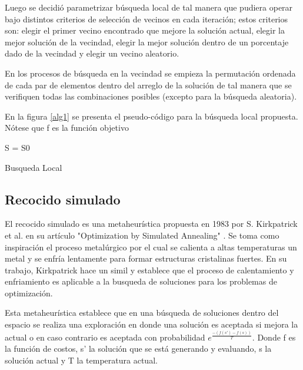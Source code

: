 \documentclass{ci5652}
\begin{document}
Luego se decidió parametrizar búsqueda local de tal manera que pudiera operar bajo distintos criterios de selección de vecinos en cada iteración; estos criterios son: elegir el primer vecino encontrado que mejore la solución actual, elegir la mejor solución de la vecindad, elegir la mejor solución dentro de un porcentaje dado de la vecindad y elegir un vecino aleatorio.

En los procesos de búsqueda en la vecindad se empieza la permutación ordenada de cada par de elementos dentro del arreglo de la solución de tal manera que se verifiquen todas las combinaciones posibles (excepto para la búsqueda aleatoria). 

En la figura \ref{alg1} se presenta el pseudo-código para la búsqueda local propuesta. Nótese que f es la función objetivo

\begin{algorithm}
 \label{alg1}
 \DontPrintSemicolon
 \vspace*{0.1cm}
 S = S0 
 \vspace*{0.1cm}
 \caption{Busqueda Local}
\end{algorithm}

\subsection{Recocido simulado}
 
 El recocido simulado es una metaheurística propuesta en 1983 por S. Kirkpatrick et al. en su artículo "Optimization by Simulated Annealing" \cite{7}. Se toma como inspiración el proceso metalúrgico por el cual se calienta a altas temperaturas un metal y se enfría lentamente para formar estructuras cristalinas fuertes.
 En su trabajo, Kirkpatrick hace un simil y establece que el proceso de calentamiento y enfriamiento es aplicable a la busqueda de soluciones para los problemas de optimización.

Esta metaheurística establece que en una búsqueda de soluciones dentro del espacio se realiza una exploración en donde una solución es aceptada si mejora la actual o en caso contrario es aceptada con probabilidad $e^{\frac{-(f(s')-f(s))}{T}}$. Donde f es la función de costos, s' la solución que se está generando y evaluando, s la solución actual y T la temperatura actual.
\end{document}
